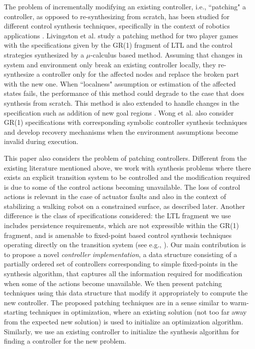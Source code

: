The problem of incrementally modifying an existing controller, i.e., ``patching" a controller, as opposed to re-synthesizing from scratch, has been studied for different control synthesis techniques, specifically in the context of robotics applications \cite{Livingston,Livingston2014,wong2014correct}. Livingston et al. \cite{Livingston} study a patching method for two player games with the specifications given by the GR(1) fragment of LTL and the control strategies synthesized by a $ \mu $-calculus based method. Assuming that changes in system and environment only break an existing controller locally, they re-synthesize a controller only for the affected nodes and replace the broken part with the new one. When ``localness" assumption or estimation of the affected states fails, the performance of this method could degrade to the case that does synthesis from scratch. This method is also extended to handle changes in the specification such as addition of new goal regions \cite{Livingston2014}. Wong et al. \cite{wong2014correct} also consider GR(1) specifications with corresponding symbolic controller synthesis techniques and develop recovery mechanisms when the environment assumptions become invalid during execution. 

This paper also considers the problem of patching controllers. Different from the existing literature mentioned above, we work with synthesis problems where there exists an explicit transition system to be controlled and the modification required is due to some of the control actions becoming unavailable. The loss of control actions is relevant in the case of actuator faults and also in the context of stabilizing a walking robot on a constrained surface, as described later. Another difference is the class of specifications considered: the LTL fragment we use includes persistence requirements, which are not expressible within the GR(1) fragment, and is amenable to fixed-point based control synthesis techniques operating directly on the transition system (see e.g., \cite{wolff2013efficient,Nilsson2017}). Our main contribution is to propose a novel \emph{controller implementation}, a data structure consisting of a partially ordered set of controllers corresponding to simple fixed-points in the synthesis algorithm,  that captures all the information required for modification when some of the actions become unavailable. We then present patching techniques using this data structure that modify it appropriately to compute the new controller. The proposed patching techniques are in a sense similar to warm-starting techniques in optimization, where an existing solution (not too far away from the expected new solution) is used to initialize an optimization algorithm. Similarly, we use an existing controller to initialize the synthesis algorithm for finding a controller for the new problem. 

